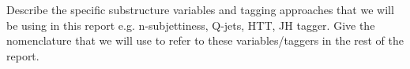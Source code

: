 Describe the specific substructure variables and tagging approaches
that we will be using in this report e.g. n-subjettiness, Q-jets, HTT,
JH tagger. Give the nomenclature that we will use to refer to these
variables/taggers in the rest of the report.

